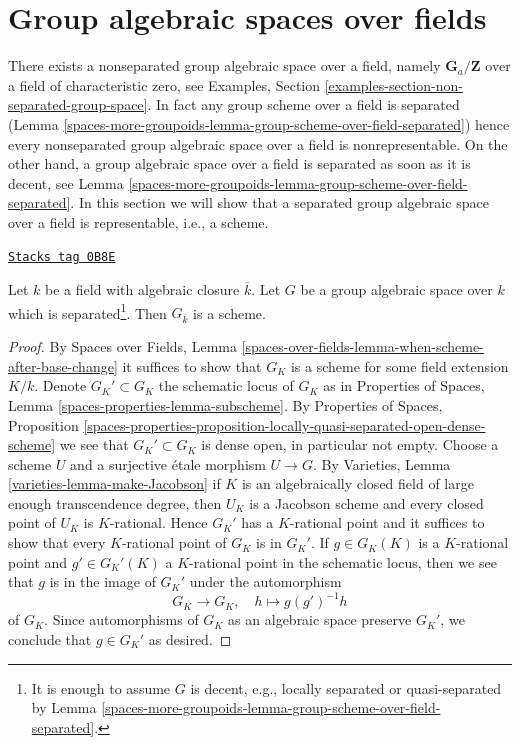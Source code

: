 \section{Group algebraic spaces over fields}
\label{spaces-more-groupoids-section-group-algebraic-spaces-over-fields}
There exists a nonseparated group algebraic space over a field,
namely $\mathbf{G}_a/\mathbf{Z}$ over a field of characteristic zero, see
Examples, Section \ref{examples-section-non-separated-group-space}.
In fact any group scheme over a field is separated
(Lemma \ref{spaces-more-groupoids-lemma-group-scheme-over-field-separated})
hence every nonseparated group algebraic space over a field
is nonrepresentable. On the other hand, a group algebraic
space over a field is separated as soon as it is decent, see
Lemma \ref{spaces-more-groupoids-lemma-group-scheme-over-field-separated}.
In this section we will show that
a separated group algebraic space over a field
is representable, i.e., a scheme.

\begin{lemma}
\label{spaces-more-groupoids-lemma-group-space-scheme-over-kbar}
\href{https://stacks.math.columbia.edu/tag/0B8E}{\texttt{Stacks tag 0B8E}}

Let $k$ be a field with algebraic closure $\overline{k}$.
Let $G$ be a group algebraic space over $k$
which is separated\footnote{It is enough to assume $G$ is decent,
e.g., locally separated or quasi-separated by
Lemma \ref{spaces-more-groupoids-lemma-group-scheme-over-field-separated}.}.
Then $G_{\overline{k}}$ is a scheme.
\end{lemma}

\begin{proof}
By Spaces over Fields, Lemma
\ref{spaces-over-fields-lemma-when-scheme-after-base-change}
it suffices to show that $G_K$ is a scheme for some field
extension $K/k$. Denote $G_K' \subset G_K$ the schematic
locus of $G_K$ as in Properties of Spaces, Lemma
\ref{spaces-properties-lemma-subscheme}.
By Properties of Spaces, Proposition
\ref{spaces-properties-proposition-locally-quasi-separated-open-dense-scheme}
we see that $G_K' \subset G_K$ is dense open, in particular not empty.
Choose a scheme $U$ and a surjective \'etale morphism $U \to G$. By
Varieties, Lemma \ref{varieties-lemma-make-Jacobson}
if $K$ is an algebraically closed field of large enough
transcendence degree, then $U_K$ is a Jacobson scheme and
every closed point of $U_K$ is $K$-rational.
Hence $G_K'$ has a $K$-rational point and it suffices
to show that every $K$-rational point of $G_K$ is in $G_K'$.
If $g \in G_K(K)$ is a $K$-rational point and $g' \in G_K'(K)$
a $K$-rational point in the schematic locus, then we see that
$g$ is in the image of $G_K'$ under the automorphism
$$
G_K \longrightarrow G_K,\quad
h \longmapsto g(g')^{-1}h
$$
of $G_K$. Since automorphisms of $G_K$ as an algebraic space preserve
$G_K'$, we conclude that $g \in G_K'$ as desired.
\end{proof}

